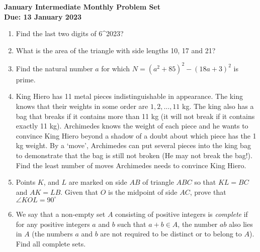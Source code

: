 \documentclass{article}
\begin{document}
\thispagestyle{empty}

\begin{center}
  \textbf{\Large January Intermediate Monthly Problem Set}
  \\ \vspace{1em}
  \textbf{\large Due: 13 January 2023}
\end{center}

\bigskip \bigskip

\begin{enumerate}[itemsep=\fill]

\item %
Find the last two digits of 6^{2023}?
 
\item %
What is the area of the triangle with side lengths 10, 17 and 21?


\item %
Find the natural number $a$ for which $N = (a^{2} + 85)^{2} - (18a+3)^{2}$ is prime.


\item %
King Hiero has 11 metal pieces indistinguishable in appearance. The king knows that their weights in some order are $1,2,...,11$ kg. The king also has a bag that breaks if it contains more than 11 kg (it will not break if it contains exactly 11 kg). Archimedes knows the weight of each piece and he wants to convince King Hiero beyond a shadow of a doubt about which piece has the 1 kg weight. By a `move', Archimedes can put several pieces into the king bag to demonstrate that the bag is still not broken (He may not break the bag!). Find the least number of moves Archimedes needs to convince King Hiero. 


\item %
Points $K$, and $L$ are marked on side $AB$ of triangle $ABC$ so that $KL=BC$ and $AK=LB$. Given that $O$ is the midpoint of side $AC$, prove that $\angle{KOL} = 90^{\circ}$


\item %
We say that a non-empty set $A$ consisting of positive integers is \textit{complete} if for any positive integers $a$ and $b$ such that $a+b\in A$, the number $ab$ also lies in $A$ (the numbers $a$ and $b$ are not required to be distinct or to belong to $A$). Find all complete sets.

\end{enumerate}
\end{document}
